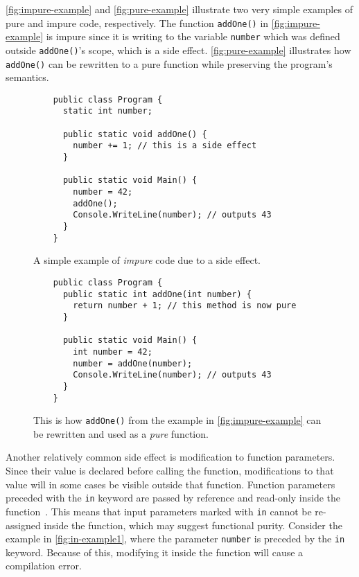 \documentclass[a4paper,12pt]{article}
\begin{document}
\autoref{fig:impure-example} and \autoref{fig:pure-example} illustrate two very simple examples of pure and impure code, respectively. The function \texttt{addOne()} in \autoref{fig:impure-example} is impure since it is writing to the variable \texttt{number} which was defined outside \texttt{addOne()}'s scope, which is a side effect. \autoref{fig:pure-example} illustrates how \texttt{addOne()} can be rewritten to a pure function while preserving the program's semantics.

\begin{figure}[H]
  \centering
  \begin{lstlisting}
    public class Program {
      static int number;

      public static void addOne() {
        number += 1; // this is a side effect
      }

      public static void Main() {
        number = 42;
        addOne();
        Console.WriteLine(number); // outputs 43
      }
    }
  \end{lstlisting}
  \caption{A simple example of \textit{impure} code due to a side effect.}
  \label{fig:impure-example}
\end{figure}

\begin{figure}[H]
  \centering
  \begin{lstlisting}
    public class Program {
      public static int addOne(int number) {
        return number + 1; // this method is now pure
      }

      public static void Main() {
        int number = 42;
        number = addOne(number);
        Console.WriteLine(number); // outputs 43
      }
    }
  \end{lstlisting}
  \caption{This is how \texttt{addOne()} from the example in \autoref{fig:impure-example} can be rewritten and used as a \textit{pure} function.}
  \label{fig:pure-example}
\end{figure}

Another relatively common side effect is modification to function parameters. Since their value is declared before calling the function, modifications to that value will in some cases be visible outside that function. Function parameters preceded with the \texttt{in} keyword are passed by reference and read-only inside the function~\cite{microsoft-in-modifier}. This means that input parameters marked with \texttt{in} cannot be re-assigned inside the function, which may suggest functional purity. Consider the example in \autoref{fig:in-example1}, where the parameter \texttt{number} is preceded by the \texttt{in} keyword. Because of this, modifying it inside the function will cause a compilation error.
\end{document}
